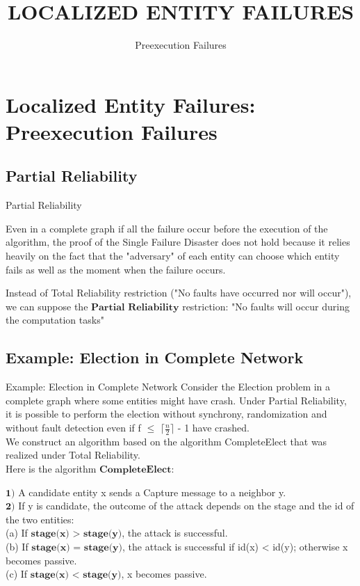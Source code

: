\documentclass{beamer}
\begin{document}
\title[Bani Gabriele 5719258]{LOCALIZED ENTITY FAILURES}
\subtitle[]{Preexecution Failures}
\section{Localized Entity Failures: Preexecution Failures}
\begin{frame}
\titlepage
\end{frame}

\subsection{Partial Reliability}
\begin{frame}{Partial Reliability}
\begin{flushleft}
Even in a complete graph if all the failure occur before the execution of the algorithm, the proof of the Single Failure Disaster does not hold because it relies heavily on the fact that the "adversary" of each entity can choose which entity fails as well as the moment when the failure occurs.
\end{flushleft}
\begin{flushleft}
Instead of Total Reliability restriction ("No faults have occurred nor will occur"), we can suppose the $\textbf{Partial Reliability}$ restriction: "No faults will occur during the computation tasks"
\end{flushleft}
\end{frame}

\subsection{Example: Election in Complete Network}
\begin{frame}{Example: Election in Complete Network}
\small
Consider the Election problem in a complete graph where some entities might have crash. Under Partial Reliability, it is possible to perform the election without synchrony, randomization and without fault detection even if f $\leq$ $\lceil\frac{n}{2}\rceil$ - 1 have crashed.\\
We construct an algorithm based on the algorithm CompleteElect that was realized under Total Reliability.\\ Here is the algorithm $\textbf{CompleteElect}$:
\begin{block}{}
$\textbf{1)}$ A candidate entity x sends a Capture message to a neighbor y.\\ \medskip
$\textbf{2)}$ If y is candidate, the outcome of the attack depends on the stage and the id of the two entities:\\ \medskip
(a) If $\textbf{stage(x) > stage(y)}$, the attack is successful.\\
(b) If $\textbf{stage(x) = stage(y)}$, the attack is successful if id(x) < id(y); otherwise x becomes passive.\\
(c) If $\textbf{stage(x) < stage(y)}$, x becomes passive.
\end{block}
\end{frame}
\end{document}
